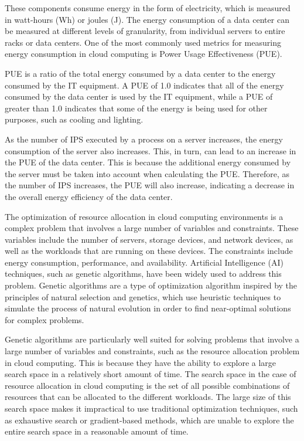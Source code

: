 These components consume energy in the form of electricity, which is measured in watt-hours (Wh) or joules (J). 
The energy consumption of a data center can be measured at different levels of granularity, from individual servers to entire racks or data centers. 
One of the most commonly used metrics for measuring energy consumption in cloud computing is Power Usage Effectiveness (PUE). 

PUE is a ratio of the total energy consumed by a data center to the energy consumed by the IT equipment. 
A PUE of 1.0 indicates that all of the energy consumed by the data center is used by the IT equipment, while a PUE of greater than 1.0 indicates that some of the energy 
is being used for other purposes, such as cooling and lighting.

As the number of IPS executed by a process on a server increases, the energy consumption of the server also increases. 
This, in turn, can lead to an increase in the PUE of the data center. This is because the additional energy consumed by the server must be taken into account 
when calculating the PUE. Therefore, as the number of IPS increases, the PUE will also increase, indicating a decrease in the overall energy efficiency of the data center.


The optimization of resource allocation in cloud computing environments is a complex problem that involves a large number of variables and constraints. These variables include the number of servers, storage devices, and network devices, as well as the workloads that are running on these devices. The constraints include energy consumption, performance, and availability. Artificial Intelligence (AI) techniques, such as genetic algorithms, have been widely used to address this problem. Genetic algorithms are a type of optimization algorithm inspired by the principles of natural selection and genetics, which use heuristic techniques to simulate the process of natural evolution in order to find near-optimal solutions for complex problems.

Genetic algorithms are particularly well suited for solving problems that involve a large number of variables and constraints, such as the resource allocation problem in cloud computing. This is because they have the ability to explore a large search space in a relatively short amount of time. The search space in the case of resource allocation in cloud computing is the set of all possible combinations of resources that can be allocated to the different workloads. The large size of this search space makes it impractical to use traditional optimization techniques, such as exhaustive search or gradient-based methods, which are unable to explore the entire search space in a reasonable amount of time.

